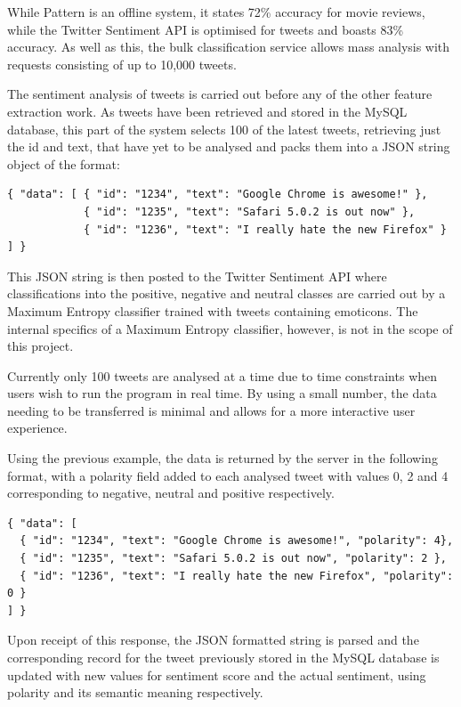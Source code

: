 While Pattern is an offline system, it states 72\% accuracy for movie reviews\cite{pattern}, while the Twitter Sentiment API is optimised for tweets and boasts 83\% accuracy\cite{Go_Bhayani_Huang_2009}. As well as this, the bulk classification service allows mass analysis with requests consisting of up to 10,000 tweets.

The sentiment analysis of tweets is carried out before any of the other feature extraction work. As tweets have been retrieved and stored in the MySQL database, this part of the system selects 100 of the latest tweets, retrieving just the id and text, that have yet to be analysed and packs them into a JSON string object of the format:

\begin{verbatim}
{ "data": [ { "id": "1234", "text": "Google Chrome is awesome!" },
            { "id": "1235", "text": "Safari 5.0.2 is out now" },
            { "id": "1236", "text": "I really hate the new Firefox" } ] }
\end{verbatim}

This JSON string is then posted to the Twitter Sentiment API where classifications into the positive, negative and neutral classes are carried out by a Maximum Entropy classifier trained with tweets containing emoticons. The internal specifics of a Maximum Entropy classifier, however, is not in the scope of this project. %

Currently only 100 tweets are analysed at a time due to time constraints when users wish to run the program in real time. By using a small number, the data needing to be transferred is minimal and allows for a more interactive user experience.

Using the previous example, the data is returned by the server in the following format, with a polarity field added to each analysed tweet with values 0, 2 and 4 corresponding to negative, neutral and positive respectively.
\begin{verbatim}
{ "data": [ 
  { "id": "1234", "text": "Google Chrome is awesome!", "polarity": 4},
  { "id": "1235", "text": "Safari 5.0.2 is out now", "polarity": 2 },
  { "id": "1236", "text": "I really hate the new Firefox", "polarity": 0 } 
] }
\end{verbatim}

Upon receipt of this response, the JSON formatted string is parsed and the corresponding record for the tweet previously stored in the MySQL database is updated with new values for sentiment score and the actual sentiment, using polarity and its semantic meaning respectively.

